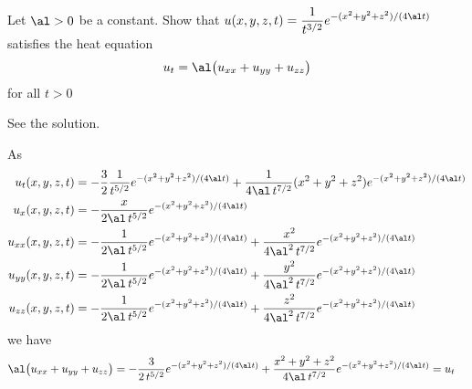\subsection*{\Application}

\begin{question}
Let $\al>0$ be a constant.
Show that $\displaystyle u(x,y,z,t) =\frac{1}{t^{3/2}} 
             e^{-(x^2+y^2+z^2)/(4\al t)}$ satisfies the heat equation
\begin{equation*}
u_t =  \al\big(u_{xx} + u_{yy} + u_{zz} \big)
\end{equation*}
for all $t>0$
\end{question}


\begin{answer}
See the solution.
\end{answer}

\begin{solution}
As
\begin{align*}
u_t(x,y,z,t)
&=-\frac{3}{2}\frac{1}{t^{5/2}} e^{-(x^2+y^2+z^2)/(4\al t)}
  +\frac{1}{4\al\,t^{7/2}}(x^2+y^2+z^2) e^{-(x^2+y^2+z^2)/(4\al t)} \\
u_x(x,y,z,t)
&=-\frac{x}{2\al\,t^{5/2}} e^{-(x^2+y^2+z^2)/(4\al t)} \\
u_{xx}(x,y,z,t)
&=-\frac{1}{2\al\,t^{5/2}} e^{-(x^2+y^2+z^2)/(4\al t)}
  +\frac{x^2}{4\al^2\,t^{7/2}} e^{-(x^2+y^2+z^2)/(4\al t)} \\
u_{yy}(x,y,z,t)
&=-\frac{1}{2\al\,t^{5/2}} e^{-(x^2+y^2+z^2)/(4\al t)}
  +\frac{y^2}{4\al^2\,t^{7/2}} e^{-(x^2+y^2+z^2)/(4\al t)} \\
u_{zz}(x,y,z,t)
&=-\frac{1}{2\al\,t^{5/2}} e^{-(x^2+y^2+z^2)/(4\al t)}
  +\frac{z^2}{4\al^2\,t^{7/2}} e^{-(x^2+y^2+z^2)/(4\al t)} 
\end{align*}
we have
\begin{align*}
\al\big(u_{xx} + u_{yy} + u_{zz} \big)
&=-\frac{3}{2\,t^{5/2}} e^{-(x^2+y^2+z^2)/(4\al t)}
  +\frac{x^2+y^2+z^2}{4\al\,t^{7/2}} e^{-(x^2+y^2+z^2)/(4\al t)}
=u_t 
\end{align*}

\end{solution}



